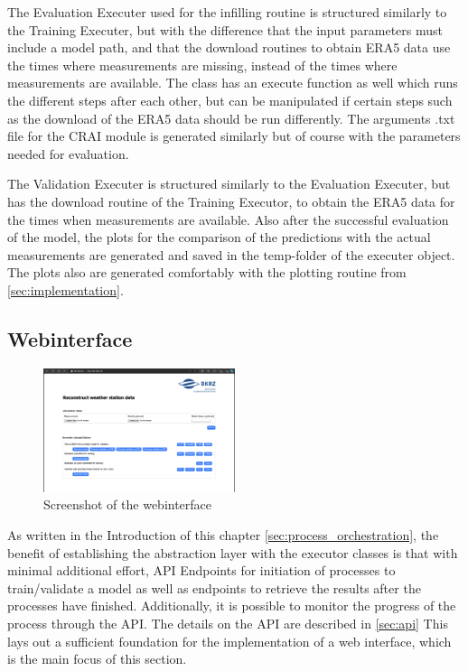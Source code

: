 The Evaluation Executer used for the infilling routine is structured similarly to the Training Executer, but with the difference that the input parameters must include a model path, and that the download routines to obtain ERA5 data use the times where measurements are missing, instead of the times where measurements are available. The class has an execute function as well which runs the different steps after each other, but can be manipulated if certain steps such as the download of the ERA5 data should be run differently. The arguments .txt file for the CRAI module is generated similarly but of course with the parameters needed for evaluation.

The Validation Executer is structured similarly to the Evaluation Executer, but has the download routine of the Training Executor, to obtain the ERA5 data for the times when measurements are available. Also after the successful evaluation of the model, the plots for the comparison of the predictions with the actual measurements are generated and saved in the temp-folder of the executer object. The plots also are generated comfortably with the plotting routine from \autoref{sec:implementation}.

\subsection{Webinterface}

\begin{figure}
    \centering
    \includegraphics[width=0.5\textwidth]{resources/images/webinterface_screenshot.png}
    \caption{Screenshot of the webinterface}
    \label{fig:webinterface_screenshot}
\end{figure}

As written in the Introduction of this chapter \ref{sec:process_orchestration}, the benefit of establishing the abstraction layer with the executor classes is that with minimal additional effort, API Endpoints for initiation of processes to train/validate a model as well as endpoints to retrieve the results after the processes have finished. Additionally, it is possible to monitor the progress of the process through the API. The details on the API are described in \autoref{sec:api} This lays out a sufficient foundation for the implementation of a web interface, which is the main focus of this section.

